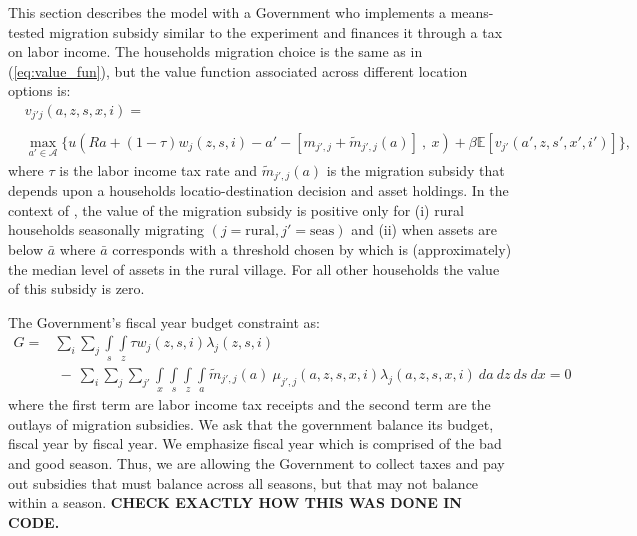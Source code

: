 \documentclass[12pt,pdftex]{article}
\begin{document}
\begin{onehalfspacing}
This section describes the model with a Government who implements a means-tested migration subsidy similar to the \citet{brch14} experiment and finances it through a tax on labor income. The households migration choice is the same as in (\ref{eq:value_fun}), but the value function associated across different location options is:
\begin{align}
& v_{j'j}(a, z,  s, x, i) = \nonumber \\
\nonumber \\
& \max_{a'\in \mathcal{A}}\bigg  \{ u(Ra + (1 - \tau)w_{j}(z, s, i) - a' - [m_{j',j} + \tilde{m}_{j',j}(a)] \ , \  x)  + \beta \mathbb{E} [v_{j'}(a', z, s', x', i')]  \bigg\},
\label{eq:value_fun_tax}
\end{align}
where $\tau$ is the labor income tax rate and $\tilde{m}_{j',j}(a)$ is the migration subsidy that depends upon a households locatio-destination decision and asset holdings. In the context of \citet{brch14}, the value of the migration subsidy is positive only for (i) rural households seasonally migrating $(j = \mbox{rural}, j' = \mbox{seas})$ and (ii) when assets are below $\bar a$ where $\bar a$ corresponds with a threshold chosen by \citet{brch14} which is (approximately) the median level of assets in the rural village. For all other households the value of this subsidy is zero.

The Government's fiscal year budget constraint as:
{\small
\begin{align}
G =& \sum_{i} \sum_{j} \int\limits_{s} \int\limits_{z} \tau  w_{j}(z,s,i)\lambda_j(z,s,i)  \nonumber \\
& \ - \ \sum_{i} \sum_{j}\sum_{j'} \int\limits_{x} \int\limits_{s} \int\limits_{z} \int\limits_{a} \tilde{m}_{j',j}(a) \ \mu_{j',j}(a, z, s, x, i) \lambda_j(a, z, s, x, i) \ da \ dz \ ds \ dx  = 0
\label{eq:gov_budget}
\end{align}}where the first term are labor income tax receipts and the second term are the outlays of migration subsidies. We ask that the government balance its budget, fiscal year by fiscal year. We emphasize fiscal year which is comprised of the bad and good season. Thus, we are allowing the Government to collect taxes and pay out subsidies that must balance across all seasons, but that may not balance within a season. \textbf{CHECK EXACTLY HOW THIS WAS DONE IN CODE.}


\end{onehalfspacing}
\end{document}
